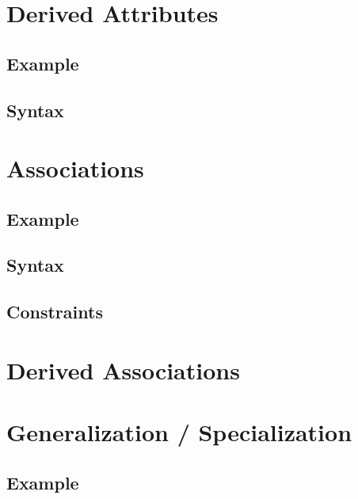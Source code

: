\documentclass[a4paper,oneside,12pt, extrafontsizes]{memoir}
\theoremstyle{definition}
\theoremstyle{definition}
\theoremstyle{definition}
\theoremstyle{definition}
\begin{document}
\chapter{Derived Attributes}
\label{ch:derived-attributes}


\section{Example}


\section{Syntax}


\chapter{Associations}
\label{ch:associations}


\section{Example}


\section{Syntax}


\section{Constraints}


\chapter{Derived Associations}
\label{ch:derived-associations}

\chapter{Generalization / Specialization}
\label{ch:generalization}


\section{Example}

\end{document}
